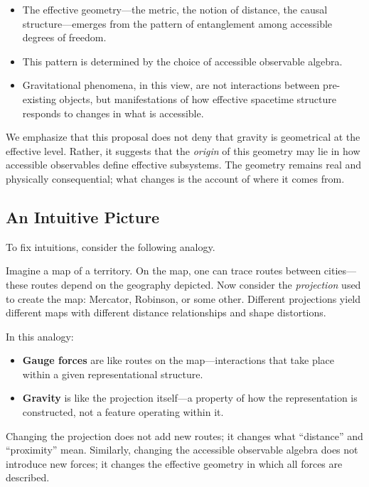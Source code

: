 \documentclass[12pt,a4paper,openany]{book}
\begin{document}
\begin{itemize}
    \item The effective geometry—the metric, the notion of distance, the causal structure—emerges from the pattern of entanglement among accessible degrees of freedom.
    \item This pattern is determined by the choice of accessible observable algebra.
    \item Gravitational phenomena, in this view, are not interactions between pre-existing objects, but manifestations of how effective spacetime structure responds to changes in what is accessible.
\end{itemize}

We emphasize that this proposal does not deny that gravity is geometrical at the effective level. Rather, it suggests that the \emph{origin} of this geometry may lie in how accessible observables define effective subsystems. The geometry remains real and physically consequential; what changes is the account of where it comes from.

\subsection{An Intuitive Picture}

To fix intuitions, consider the following analogy.

Imagine a map of a territory. On the map, one can trace routes between cities—these routes depend on the geography depicted. Now consider the \emph{projection} used to create the map: Mercator, Robinson, or some other. Different projections yield different maps with different distance relationships and shape distortions.

In this analogy:
\begin{itemize}
    \item \textbf{Gauge forces} are like routes on the map—interactions that take place within a given representational structure.
    \item \textbf{Gravity} is like the projection itself—a property of how the representation is constructed, not a feature operating within it.
\end{itemize}

Changing the projection does not add new routes; it changes what ``distance'' and ``proximity'' mean. Similarly, changing the accessible observable algebra does not introduce new forces; it changes the effective geometry in which all forces are described.
\end{document}
